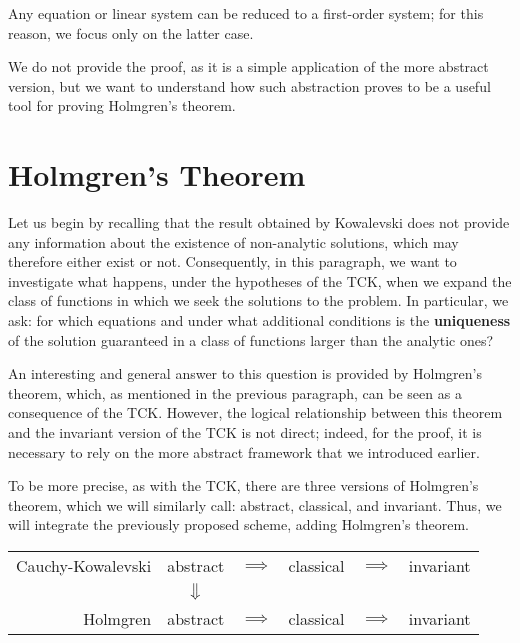 \begin{remark}
Any equation or linear system can be reduced to a first-order system; for this reason, we focus only on the latter case.
\end{remark}

We do not provide the proof, as it is a simple application of the more abstract version, but we want to understand how such abstraction proves to be a useful tool for proving Holmgren's theorem.


\newpage
\section{Holmgren's Theorem}

Let us begin by recalling that the result obtained by Kowalevski does not provide any information about the existence of non-analytic solutions, which may therefore either exist or not. Consequently, in this paragraph, we want to investigate what happens, under the hypotheses of the TCK, when we expand the class of functions in which we seek the solutions to the problem. In particular, we ask: for which equations and under what additional conditions is the \textbf{uniqueness} of the solution guaranteed in a class of functions larger than the analytic ones?

An interesting and general answer to this question is provided by Holmgren's theorem, which, as mentioned in the previous paragraph, can be seen as a consequence of the TCK. However, the logical relationship between this theorem and the invariant version of the TCK is not direct; indeed, for the proof, it is necessary to rely on the more abstract framework that we introduced earlier.

To be more precise, as with the TCK, there are three versions of Holmgren's theorem, which we will similarly call: abstract, classical, and invariant. Thus, we will integrate the previously proposed scheme, adding Holmgren's theorem.

\begin{center}
\renewcommand{\arraystretch}{1.5}
\begin{tabular}{r||ccccc} 
Cauchy-Kowalevski & abstract & $\implies$  & classical & $\implies$ & invariant\\
&$\big\Downarrow$ &&&&\\
Holmgren & abstract & $\implies$ & classical & $\implies$ & invariant\\
\end{tabular}
\end{center}

